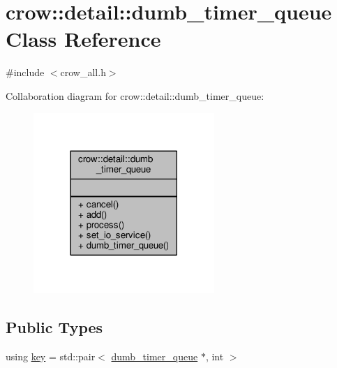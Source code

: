 \hypertarget{classcrow_1_1detail_1_1dumb__timer__queue}{\section{crow\-:\-:detail\-:\-:dumb\-\_\-timer\-\_\-queue Class Reference}
\label{classcrow_1_1detail_1_1dumb__timer__queue}
}


{\ttfamily \#include $<$crow\-\_\-all.\-h$>$}



Collaboration diagram for crow\-:\-:detail\-:\-:dumb\-\_\-timer\-\_\-queue\-:
\nopagebreak
\begin{figure}[H]
\begin{center}
\leavevmode
\includegraphics[width=194pt]{classcrow_1_1detail_1_1dumb__timer__queue__coll__graph}
\end{center}
\end{figure}
\subsection*{Public Types}
\begin{DoxyCompactItemize}
\item 
using \hyperlink{classcrow_1_1detail_1_1dumb__timer__queue_ab5d8614b57cf57c37d51428b3baad6d8}{key} = std\-::pair$<$ \hyperlink{classcrow_1_1detail_1_1dumb__timer__queue}{dumb\-\_\-timer\-\_\-queue} $\ast$, int $>$
\end{DoxyCompactItemize}
